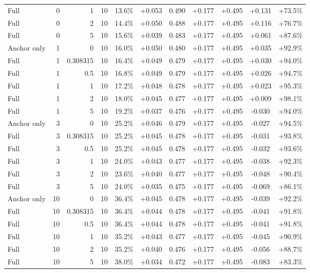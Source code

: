 \begin{table}[htbp]
\begin{tabular}{lrrrccccccc}
Full & 0 & 1 & 10 & 13.6\% & +0.053 & 0.490 & +0.177 & +0.495 & +0.131 & +73.5\% \\
Full & 0 & 2 & 10 & 14.4\% & +0.050 & 0.488 & +0.177 & +0.495 & +0.116 & +76.7\% \\
Full & 0 & 5 & 10 & 15.6\% & +0.039 & 0.483 & +0.177 & +0.495 & +0.061 & +87.6\% \\
Anchor only & 1 & 0 & 10 & 16.0\% & +0.050 & 0.480 & +0.177 & +0.495 & +0.035 & +92.9\% \\
Full & 1 & 0.308315 & 10 & 16.4\% & +0.049 & 0.479 & +0.177 & +0.495 & +0.030 & +94.0\% \\
Full & 1 & 0.5 & 10 & 16.8\% & +0.049 & 0.479 & +0.177 & +0.495 & +0.026 & +94.7\% \\
Full & 1 & 1 & 10 & 17.2\% & +0.048 & 0.478 & +0.177 & +0.495 & +0.023 & +95.3\% \\
Full & 1 & 2 & 10 & 18.0\% & +0.045 & 0.477 & +0.177 & +0.495 & +0.009 & +98.1\% \\
Full & 1 & 5 & 10 & 19.2\% & +0.037 & 0.476 & +0.177 & +0.495 & -0.030 & +94.0\% \\
Anchor only & 3 & 0 & 10 & 25.2\% & +0.046 & 0.479 & +0.177 & +0.495 & -0.027 & +94.5\% \\
Full & 3 & 0.308315 & 10 & 25.2\% & +0.045 & 0.478 & +0.177 & +0.495 & -0.031 & +93.8\% \\
Full & 3 & 0.5 & 10 & 25.2\% & +0.045 & 0.478 & +0.177 & +0.495 & -0.032 & +93.6\% \\
Full & 3 & 1 & 10 & 24.0\% & +0.043 & 0.477 & +0.177 & +0.495 & -0.038 & +92.3\% \\
Full & 3 & 2 & 10 & 23.6\% & +0.040 & 0.477 & +0.177 & +0.495 & -0.048 & +90.4\% \\
Full & 3 & 5 & 10 & 24.0\% & +0.035 & 0.475 & +0.177 & +0.495 & -0.069 & +86.1\% \\
Anchor only & 10 & 0 & 10 & 36.4\% & +0.045 & 0.478 & +0.177 & +0.495 & -0.039 & +92.2\% \\
Full & 10 & 0.308315 & 10 & 36.4\% & +0.044 & 0.478 & +0.177 & +0.495 & -0.041 & +91.8\% \\
Full & 10 & 0.5 & 10 & 36.4\% & +0.044 & 0.478 & +0.177 & +0.495 & -0.041 & +91.8\% \\
Full & 10 & 1 & 10 & 35.2\% & +0.043 & 0.477 & +0.177 & +0.495 & -0.045 & +90.9\% \\
Full & 10 & 2 & 10 & 35.2\% & +0.040 & 0.476 & +0.177 & +0.495 & -0.056 & +88.7\% \\
Full & 10 & 5 & 10 & 38.0\% & +0.034 & 0.472 & +0.177 & +0.495 & -0.083 & +83.3\% \\

\end{tabular}
\end{table}
